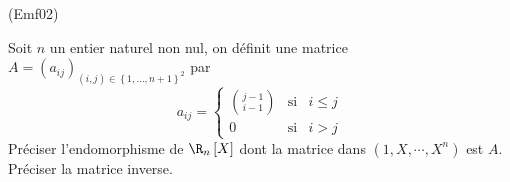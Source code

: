 \begin{tiny}(Emf02)\end{tiny}
Soit $n$ un entier naturel non nul, on d{\'e}finit une matrice $A=(a_{ij})_{(i,j)\in \left\{ 1,\ldots ,n+1\right\} ^{2}}$ par
\[
a_{ij}=\left\{
\begin{array}{ccc}
\binom{j-1}{i-1} & \text{si} & i\leq j \\
0 & \text{si} & i>j
\end{array}
\right.
\]
Pr{\'e}ciser l'endomorphisme de $\R_{n}\left[ X\right] $ dont la matrice dans $(1,X,\cdots ,X^{n})$ est $A$. Préciser la matrice inverse.
